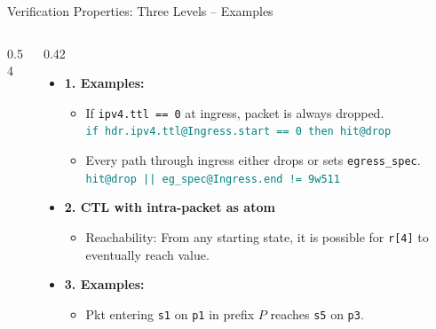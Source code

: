 \documentclass[aspectratio=169]{beamer}
\begin{document}
\begin{frame}{Verification Properties: Three Levels -- Examples}
\begin{columns}[T,onlytextwidth]
\begin{column}{0.54\textwidth}
\begin{tikzpicture}
    \end{tikzpicture}
  \end{column}

  \begin{column}{0.42\textwidth}
    \hspace*{-0.5cm}%
    \begin{minipage}{\dimexpr\linewidth+0.5cm\relax}
    \begin{itemize}
      \item \textbf{\small 1. Examples:}
        \begin{itemize}\setlength\itemsep{4pt}
          \item \scriptsize If \texttt{ipv4.ttl == 0} at ingress, packet is always dropped.
                \\ \textcolor{teal}{\texttt{if hdr.ipv4.ttl@Ingress.start == 0 then hit@drop}}
          \item \scriptsize Every path through ingress either drops or sets \texttt{egress\_spec}.
                \\ \textcolor{teal}{\texttt{hit@drop || eg\_spec@Ingress.end != 9w511}}
        \end{itemize}

      \item \textbf{\small 2. CTL with intra-packet as atom}
        \begin{itemize} %
          \item \scriptsize Reachability: From any starting state, it is possible for \texttt{r[4]} to eventually reach value.
        \end{itemize}

      \item \textbf{\small 3. Examples:}
        \begin{itemize} %
          \item \scriptsize Pkt entering \texttt{s1} on \texttt{p1} in prefix $P$ reaches \texttt{s5} on \texttt{p3}.
        \end{itemize}
    \end{itemize}
    \end{minipage}
  \end{column}
\end{columns}
\end{frame}


\end{document}
